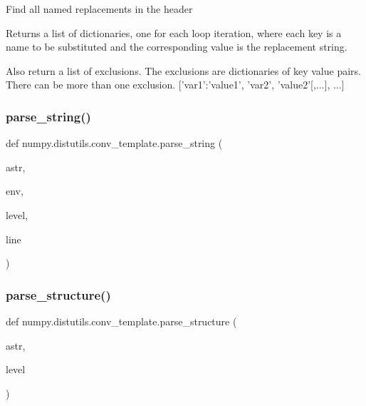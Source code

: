 \begin{DoxyVerb}Find all named replacements in the header

Returns a list of dictionaries, one for each loop iteration,
where each key is a name to be substituted and the corresponding
value is the replacement string.

Also return a list of exclusions.  The exclusions are dictionaries
 of key value pairs. There can be more than one exclusion.
 [{'var1':'value1', 'var2', 'value2'[,...]}, ...]\end{DoxyVerb}
 \mbox{\label{namespacenumpy_1_1distutils_1_1conv__template_ad8fbc52c2b4aade3f0017762dec0656b}} 
\subsubsection{\texorpdfstring{parse\+\_\+string()}{parse\_string()}}
{\footnotesize\ttfamily def numpy.\+distutils.\+conv\+\_\+template.\+parse\+\_\+string (\begin{DoxyParamCaption}\item[{}]{astr,  }\item[{}]{env,  }\item[{}]{level,  }\item[{}]{line }\end{DoxyParamCaption})}

\mbox{\label{namespacenumpy_1_1distutils_1_1conv__template_adff8a6bf8353337e7163e1f8c8188d9f}} 
\subsubsection{\texorpdfstring{parse\+\_\+structure()}{parse\_structure()}}
{\footnotesize\ttfamily def numpy.\+distutils.\+conv\+\_\+template.\+parse\+\_\+structure (\begin{DoxyParamCaption}\item[{}]{astr,  }\item[{}]{level }\end{DoxyParamCaption})}

